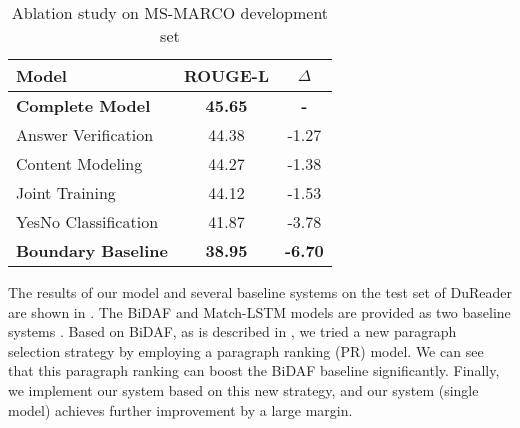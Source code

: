 \begin{table}[tbp]
\centering
\begin{tabular}{|l|c|c|}
\hline
Model           & ROUGE-L & $\Delta$ \\ \hline
\textbf{Complete Model}      & \textbf{45.65}   &  \textbf{-} \\
 \- Answer Verification  &  44.38  & -1.27  \\
 \- Content Modeling   & 44.27   & -1.38  \\
 \- Joint Training  & 44.12   & -1.53         \\
 \- YesNo Classification &  41.87  &  -3.78 \\ 
\textbf{Boundary Baseline}   &  \textbf{38.95}  &  \textbf{-6.70} \\ \hline
\end{tabular}
\caption{Ablation study on MS-MARCO development set}
\label{tab:ablation}
\end{table}

The results of our model and several baseline systems on the test set of DuReader are shown in . The BiDAF and Match-LSTM models are provided as two baseline systems \cite{dureader}. Based on BiDAF, as is described in , we tried a new paragraph selection strategy by employing a paragraph ranking (PR) model. We can see that this paragraph ranking can boost the BiDAF baseline significantly. Finally, we implement our system based on this new strategy, and our system (single model) achieves further improvement by a large margin.





